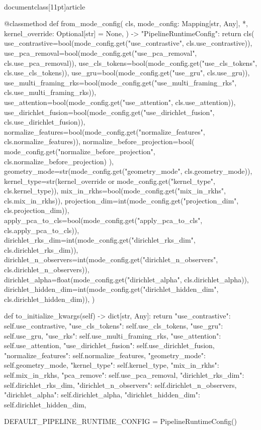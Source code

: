 \\documentclass[11pt]{article}
\begin{document}
\begin{CodeBlock}
    @classmethod
    def from_mode_config(
        cls,
        mode_config: Mapping[str, Any],
        *,
        kernel_override: Optional[str] = None,
    ) -> "PipelineRuntimeConfig":
        return cls(
            use_contrastive=bool(mode_config.get("use_contrastive", cls.use_contrastive)),
            use_pca_removal=bool(mode_config.get("use_pca_removal", cls.use_pca_removal)),
            use_cls_tokens=bool(mode_config.get("use_cls_tokens", cls.use_cls_tokens)),
            use_gru=bool(mode_config.get("use_gru", cls.use_gru)),
            use_multi_framing_rks=bool(mode_config.get("use_multi_framing_rks", cls.use_multi_framing_rks)),
            use_attention=bool(mode_config.get("use_attention", cls.use_attention)),
            use_dirichlet_fusion=bool(mode_config.get("use_dirichlet_fusion", cls.use_dirichlet_fusion)),
            normalize_features=bool(mode_config.get("normalize_features", cls.normalize_features)),
            normalize_before_projection=bool(
                mode_config.get("normalize_before_projection", cls.normalize_before_projection)
            ),
            geometry_mode=str(mode_config.get("geometry_mode", cls.geometry_mode)),
            kernel_type=str(kernel_override or mode_config.get("kernel_type", cls.kernel_type)),
            mix_in_rkhs=bool(mode_config.get("mix_in_rkhs", cls.mix_in_rkhs)),
            projection_dim=int(mode_config.get("projection_dim", cls.projection_dim)),
            apply_pca_to_cls=bool(mode_config.get("apply_pca_to_cls", cls.apply_pca_to_cls)),
            dirichlet_rks_dim=int(mode_config.get("dirichlet_rks_dim", cls.dirichlet_rks_dim)),
            dirichlet_n_observers=int(mode_config.get("dirichlet_n_observers", cls.dirichlet_n_observers)),
            dirichlet_alpha=float(mode_config.get("dirichlet_alpha", cls.dirichlet_alpha)),
            dirichlet_hidden_dim=int(mode_config.get("dirichlet_hidden_dim", cls.dirichlet_hidden_dim)),
        )

    def to_initialize_kwargs(self) -> dict[str, Any]:
        return {
            "use_contrastive": self.use_contrastive,
            "use_cls_tokens": self.use_cls_tokens,
            "use_gru": self.use_gru,
            "use_rks": self.use_multi_framing_rks,
            "use_attention": self.use_attention,
            "use_dirichlet_fusion": self.use_dirichlet_fusion,
            "normalize_features": self.normalize_features,
            "geometry_mode": self.geometry_mode,
            "kernel_type": self.kernel_type,
            "mix_in_rkhs": self.mix_in_rkhs,
            "pca_remove": self.use_pca_removal,
            "dirichlet_rks_dim": self.dirichlet_rks_dim,
            "dirichlet_n_observers": self.dirichlet_n_observers,
            "dirichlet_alpha": self.dirichlet_alpha,
            "dirichlet_hidden_dim": self.dirichlet_hidden_dim,
        }


DEFAULT_PIPELINE_RUNTIME_CONFIG = PipelineRuntimeConfig()

\end{CodeBlock}
\end{document}
